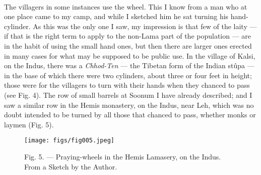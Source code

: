 \documentclass[a4paper, 11pt, oneside, polutonikogreek, english]{article}
\begin{document}
\paragraph{}
The villagers in some instances use the wheel. This I know from a man who at one place came to my camp, and while I sketched him he sat turning his hand-cylinder. As this was the only one I saw, my impression is that few of the laity --- if that is the right term to apply to the non-Lama part of the population --- are in the habit of using the small hand ones, but then there are larger ones erected in many cases for what may be supposed to be public use. In the village of Kalsi, on the Indus, there was a \emph{Chhod-Ten} --- the Tibetan form of the Indian stûpa --- in the base of which there were two cylinders, about three or four feet in height; those were for the villagers to turn with their hands when they chanced to pass (see Fig. 4). The row of small barrels at Soonum I have already described; and I saw a similar row in the Hemis monastery, on the Indus, near Leh, which was no doubt intended to be turned by all those that chanced to pass, whether monks or laymen (Fig. 5).

\begin{figure}[H]
\centering
\texttt{[image: figs/fig005.jpeg]}
\caption[Fig. 5. --- Praying-wheels in the Hemis Lamasery, on the Indus.]{Fig. 5. --- Praying-wheels in the Hemis Lamasery, on the Indus. From a Sketch by the Author.}
\end{figure}
\end{document}
